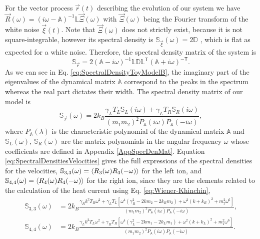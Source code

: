 For the vector process $\overrightarrow{r}(t)$ describing the evolution of our system we have $\overrightarrow{R}(\omega) = \left( i \omega - \mathbb{A} \right)^{-1}\mathbb{L}\overrightarrow{\Xi}(\omega)$ with $\overrightarrow{\Xi}(\omega)$ being the Fourier transform of the white noise $\overrightarrow{\xi}(t)$. Note that $\overrightarrow{\Xi}(\omega)$ does not strictly exist, because it is not square-integrable, however its spectral density is $\mathbb{S}_{\overrightarrow{\xi}}(\omega) = 2 \mathbb{D}$ \cite{Sarkka2019}, which is flat as expected for a white noise. Therefore, the spectral density matrix of the system is
%
\begin{equation}
  \mathbb{S}_{\overrightarrow{r}} = 2 \left(  \mathbb{A} - i\omega\right)^{-1}\mathbb{L}\mathbb{D}\mathbb{L}^\mathsf{T}\left(  \mathbb{A} + i\omega\right)^{-\mathsf{T}}.
  \label{eq:SpectralDensityToyModelB}
\end{equation}
%
As we can see in Eq. \eqref{eq:SpectralDensityToyModelB}, the imaginary part of the eigenvalues of the dynamical matrix $\mathbb{A}$ correspond to the peaks in the spectrum whereas the real part dictates their width. The spectral density matrix of our model is
%
\begin{equation}
  \mathbb{S}_{\overrightarrow{r}}(\omega) = 2 k_B \frac{\gamma_L T_L\mathbb{S}_L(i\omega)+\gamma_L T_R\mathbb{S}_R(i\omega)}{(m_1 m_2)^2 P_\mathbb{A}(i\omega)P_\mathbb{A}(-i\omega)},
\end{equation}
%
where $P_\mathbb{A}(\lambda)$ is the characteristic polynomial of the dynamical matrix $\mathbb{A}$ and $\mathbb{S}_L(\omega)$, $\mathbb{S}_R(\omega)$ are the matrix polynomials in the angular frequency $\omega$ whose coefficients are defined in Appendix \ref{AppSpecDenMat}. Equation \eqref{eq:SpectralDensitiesVelocities} gives the full expressions of the spectral densities for the velocities, $\mathbb{S}_{3,3}(\omega) = \expval{R_3(\omega)R_3(-\omega)}$ for the left ion, and $\mathbb{S}_{4,4}(\omega) = \expval{R_4(\omega)R_4(-\omega)}$ for the right ion, since they are the elements related to the calculation of the heat current using Eq. \eqref{eq:Wiener-Khinchin},
%
\begin{align}
  \mathbb{S}_{3,3}(\omega) &= 2 k_B \frac{\gamma_R k^2 T_R \omega ^2+\gamma_L T_L \left[\omega ^4 \left(\gamma_R^2-2 k m_2-2 k_R m_2\right)+\omega ^2 (k+k_R)^2+m_2^2 \omega ^6\right]}{(m_1 m_2)^2 P_\mathbb{A}(i\omega)P_\mathbb{A}(-i\omega)},\nonumber\\
  \mathbb{S}_{4,4}(\omega) &= 2 k_B \frac{\gamma_L k^2 T_L \omega ^2+\gamma_R T_R \left[\omega ^4 \left(\gamma_L^2-2 k m_1-2 k_L m_1\right)+\omega ^2 (k+k_L)^2+m_1^2 \omega ^6\right]}{(m_1 m_2)^2 P_\mathbb{A}(i\omega)P_\mathbb{A}(-i\omega)}.
  \label{eq:SpectralDensitiesVelocities}
\end{align}
